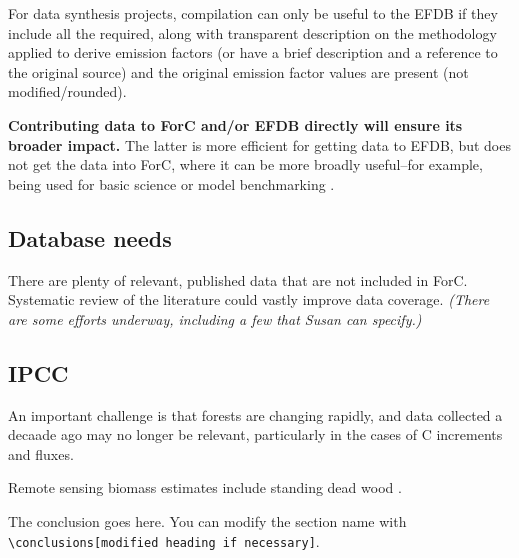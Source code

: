 \documentclass[, manuscript]{copernicus}
\begin{document}
For data synthesis projects, compilation can only be useful to the EFDB
if they include all the required, along with transparent description on
the methodology applied to derive emission factors (or have a brief
description and a reference to the original source) and the original
emission factor values are present (not modified/rounded).

\textbf{Contributing data to ForC and/or EFDB directly will ensure its
broader impact.} The latter is more efficient for getting data to EFDB,
but does not get the data into ForC, where it can be more broadly
useful--for example, being used for basic science
\citep[e.g.,][]{banburymorgan_global_2021, anderson-teixeira_carbon_2021}
or model benchmarking \citep{fer_ecosystem_2021}.

\subsection{Database needs}

There are plenty of relevant, published data that are not included in
ForC. Systematic review of the literature could vastly improve data
coverage. \emph{(There are some efforts underway, including a few that
Susan can specify.)}

\subsection{IPCC}

An important challenge is that forests are changing rapidly, and data
collected a decaade ago may no longer be relevant, particularly in the
cases of C increments and fluxes.

Remote sensing biomass estimates include standing dead wood
\citep{duncanson_aboveground_2021}.

\conclusions[Conclusions]

The conclusion goes here. You can modify the section name with
\texttt{\textbackslash{}conclusions{[}modified\ heading\ if\ necessary{]}}.







\end{document}
